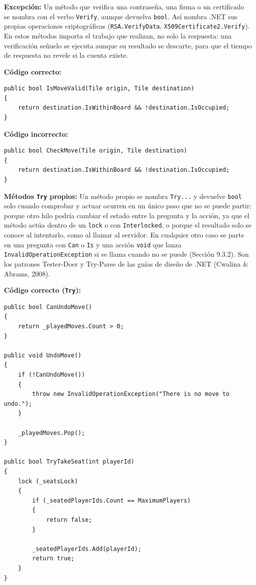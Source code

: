 \textbf{Excepción:} Un método que verifica una contraseña, una firma o un certificado se nombra con el verbo \texttt{Verify}, aunque devuelva \texttt{bool}. Así nombra .NET sus propias operaciones criptográficas (\texttt{RSA.VerifyData}, \texttt{X509Certificate2.Verify}). En estos métodos importa el trabajo que realizan, no solo la respuesta: una verificación señuelo se ejecuta aunque su resultado se descarte, para que el tiempo de respuesta no revele si la cuenta existe.

\textbf{Código correcto:}
\begin{lstlisting}[style=csharpstyle]
public bool IsMoveValid(Tile origin, Tile destination)
{
    return destination.IsWithinBoard && !destination.IsOccupied;
}
\end{lstlisting}

\textbf{Código incorrecto:}
\begin{lstlisting}[style=csharpstyle]
public bool CheckMove(Tile origin, Tile destination)
{
    return destination.IsWithinBoard && !destination.IsOccupied;
}
\end{lstlisting}

\textbf{Métodos \texttt{Try} propios:} Un método propio se nombra \texttt{Try...} y devuelve \texttt{bool} solo cuando comprobar y actuar ocurren en un único paso que no se puede partir: porque otro hilo podría cambiar el estado entre la pregunta y la acción, ya que el método actúa dentro de un \texttt{lock} o con \texttt{Interlocked}, o porque el resultado solo se conoce al intentarlo, como al llamar al servidor. En cualquier otro caso se parte en una pregunta con \texttt{Can} o \texttt{Is} y una acción \texttt{void} que lanza \texttt{InvalidOperationException} si se llama cuando no se puede (Sección 9.3.2). Son los patrones Tester-Doer y Try-Parse de las guías de diseño de .NET (Cwalina \& Abrams, 2008).

\textbf{Código correcto (\texttt{Try}):}
\begin{lstlisting}[style=csharpstyle]
public bool CanUndoMove()
{
    return _playedMoves.Count > 0;
}

public void UndoMove()
{
    if (!CanUndoMove())
    {
        throw new InvalidOperationException("There is no move to undo.");
    }

    _playedMoves.Pop();
}

public bool TryTakeSeat(int playerId)
{
    lock (_seatsLock)
    {
        if (_seatedPlayerIds.Count == MaximumPlayers)
        {
            return false;
        }

        _seatedPlayerIds.Add(playerId);
        return true;
    }
}
\end{lstlisting}

